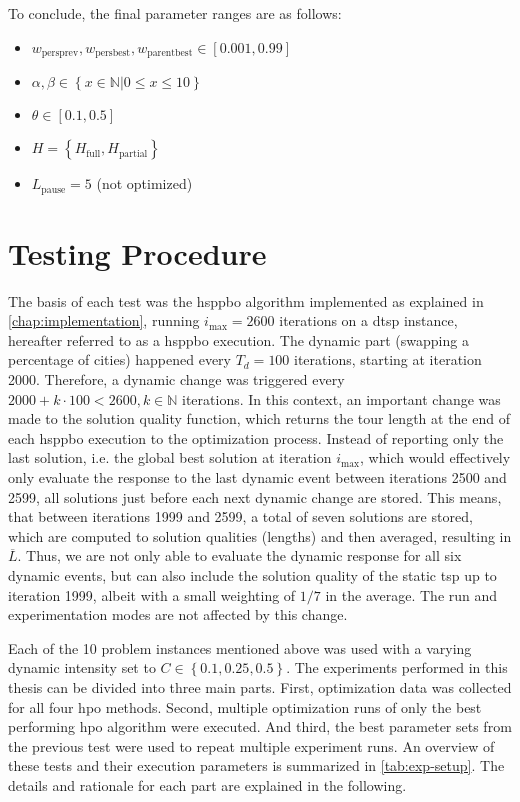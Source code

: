 To conclude, the final parameter ranges are as follows:
\begin{itemize}
	\item $w_{\text{persprev}}, w_{\text{persbest}}, w_{\text{parentbest}} \in [0.001,0.99]$
	\item $\alpha, \beta \in \left\lbrace x\in\mathbb{N} | 0 \leq x \leq 10 \right\rbrace$
	\item $\theta \in [0.1,0.5]$
	\item $H = \left\lbrace H_{\text{full}}, H_{\text{partial}} \right\rbrace$
	\item $L_\text{pause} = 5$ (not optimized)
	
\end{itemize}

\section{Testing Procedure}
\label{chap:testing}

The basis of each test was the \gls{hsppbo} algorithm implemented as explained in \cref{chap:implementation}, running $i_\text{max} = 2600$ iterations on a \gls{dtsp} instance, hereafter referred to as a \gls{hsppbo} execution. The dynamic part (swapping a percentage of cities) happened every $T_d = 100$ iterations, starting at iteration 2000. Therefore, a dynamic change was triggered every $2000 + k \cdot 100 < 2600, k \in \mathbb{N}$ iterations. In this context, an important change was made to the solution quality function, which returns the tour length at the end of each \gls{hsppbo} execution to the optimization process. Instead of reporting only the last solution, i.e. the global best solution at iteration $i_\text{max}$, which would effectively only evaluate the response to the last dynamic event between iterations 2500 and 2599, all solutions just before each next dynamic change are stored. This means, that between iterations 1999 and 2599, a total of seven solutions are stored, which are computed to solution qualities (lengths) and then averaged, resulting in $\overline{L}$. Thus, we are not only able to evaluate the dynamic response for all six dynamic events, but can also include the solution quality of the static \gls{tsp} up to iteration 1999, albeit with a small weighting of $1/7$ in the average. The run and experimentation modes are not affected by this change.

Each of the 10 problem instances mentioned above was used with a varying dynamic intensity set to $C \in \left\lbrace 0.1,0.25,0.5\right\rbrace$. The experiments performed in this thesis can be divided into three main parts. First, optimization data was collected for all four \gls{hpo} methods. Second, multiple optimization runs of only the best performing \gls{hpo} algorithm were executed. And third, the best parameter sets from the previous test were used to repeat multiple experiment runs. An overview of these tests and their execution parameters is summarized in \cref{tab:exp-setup}. The details and rationale for each part are explained in the following. 

